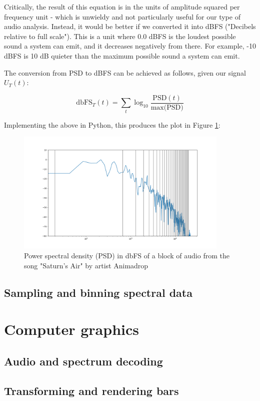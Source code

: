 \documentclass[11pt]{article}
\begin{document}
Critically, the result of this equation is in the units of amplitude squared per frequency unit - which is
unwieldy and not particularly useful for our type of audio analysis. Instead, it would be better if we
converted it into dBFS ("Decibels relative to full scale"). This is a unit where 0.0 dBFS is the loudest
possible sound a system can emit, and it decreases negatively from there. For example, -10 dBFS is 10 dB
quieter than the maximum possible sound a system can emit.

The conversion from PSD to dBFS can be achieved as follows, given our signal $U_T(t)$:

$$\text{dbFS}_T(t) = \sum_t \log_{10} \frac{\text{PSD}(t)}{\text{max(PSD)}}$$

Implementing the above in Python, this produces the plot in Figure \ref{fig:psd}:

\begin{figure}[H]
\centering
\includegraphics[width=385px]{img/psd.png}
\caption{Power spectral density (PSD) in dbFS of a block of audio from the song "Saturn's Air" by
    artist Animadrop}
\label{fig:psd}
\end{figure}

\subsection{Sampling and binning spectral data}

\section{Computer graphics}
\subsection{Audio and spectrum decoding}

\subsection{Transforming and rendering bars}
\end{document}
